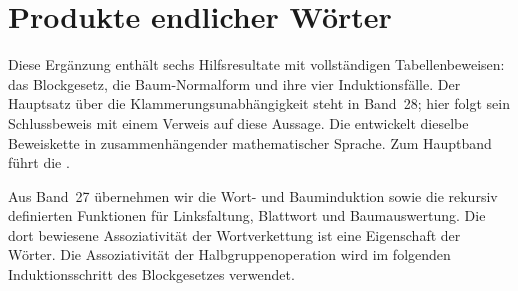\section{Produkte endlicher Wörter}

Diese Ergänzung enthält sechs Hilfsresultate mit vollständigen
Tabellenbeweisen: das Blockgesetz, die Baum-Normalform und ihre vier
Induktionsfälle. Der Hauptsatz über die Klammerungsunabhängigkeit steht
in Band~28; hier folgt sein Schlussbeweis mit einem Verweis auf diese
Aussage. Die \BracketingReadingLink{} entwickelt dieselbe Beweiskette
in zusammenhängender mathematischer Sprache.
Zum Hauptband führt die \BracketingNotationLink{}.

Aus Band~27 übernehmen wir die Wort- und Bauminduktion sowie die
rekursiv definierten Funktionen für Linksfaltung, Blattwort und
Baumauswertung. Die dort bewiesene Assoziativität der Wortverkettung ist
eine Eigenschaft der Wörter. Die Assoziativität der Halbgruppenoperation
wird im folgenden Induktionsschritt des Blockgesetzes verwendet.

\hypertarget{bracketing.statement.SemigroupWordBlockBase}{}
\BracketingWordBlockBase
\begin{tabproofwide}
\end{tabproofwide}

